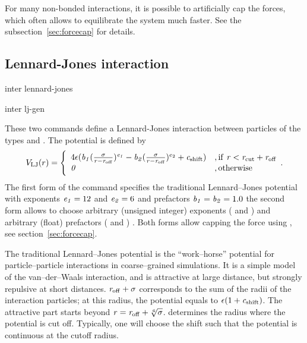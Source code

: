 For many non-bonded interactions, it is possible to artificially cap the forces,
which often allows to equilibrate the system much faster. See the
subsection~\ref{sec:forcecap} for details.

\subsection{Lennard-Jones interaction}

\begin{essyntax}
  inter  
  lennard-jones 
  \var{\epsilon} \var{\sigma} 
    
  
  inter  
  lj-gen
  \var{\epsilon} \var{\sigma} 
    
     
  \begin{features}
  \end{features}
\end{essyntax}

These two commands define a Lennard-Jones interaction between particles of the
types  and .  The potential is defined by
\begin{equation}
  \label{eq:lj}
  V_\mathrm{LJ}(r) = \Biggl\{
    \begin{array}{ll}
      4\epsilon(\mathrm{\mathit{b_1}}(\frac{\mathrm{\mathit{\sigma}}}{r-\mathrm{\mathit{r_\mathrm{off}}}})^{\mathrm{\mathit{e_1}}}
      -\mathrm{\mathit{b_2}}(\frac{\mathrm{\mathit{\sigma}}}{r-\mathrm{\mathit{r_\mathrm{off}}}})^{e_2}+\mathrm{\mathit{c_\mathrm{shift}}}) 
      & \mathrm{, if~} \mathrm{\mathit{r}} < \mathrm{\mathit{r_\mathrm{cut}}}+\mathrm{\mathit{r_\mathrm{off}}}\\
      \mathit{0} 
      & \mathrm{, otherwise}\\
    \end{array}.
\end{equation}
The first form of the command specifies the traditional Lennard--Jones
potential with exponents $\mathrm{\mathit{e_1}}=12$ and $\mathrm{\mathit{e_2}}=6$ and prefactors
$\mathrm{\mathit{b_1}} = \mathrm{\mathit{b_2}} = 1.0$ the second
form allows to choose arbitrary (unsigned integer) exponents ( and )
and arbitrary (float) prefactors ( and ) .
Both forms allow capping the force using , see
section~\ref{sec:forcecap}.

The traditional Lennard--Jones potential is the ``work--horse''
potential for particle--particle interactions in coarse--grained
simulations. It is a simple model of the van--der--Waals interaction,
and is attractive at large distance, but strongly repulsive at short
distances. $\mathrm{\mathit{r_\mathrm{off}}} + \mathrm{\mathit{\sigma}}$ corresponds to the sum
of the radii of the interaction particles; at this radius, the
potential equals to $\mathrm{\mathit{\epsilon}}(1+\mathrm{\mathit{c_\mathrm{shift}}})$. The
attractive part starts beyond $\mathrm{\mathit{r}} = \mathrm{\mathit{r_\mathrm{off}}} +
\sqrt[6]{\mathrm{\mathit{\sigma}}}$.   determines the radius where
the potential is cut off. Typically, one will choose the shift such
that the potential is continuous at the cutoff radius.

